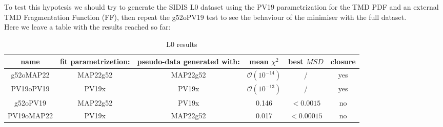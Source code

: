 \documentclass[12pt]{report}
\begin{document}
To test this hypotesis we should try to generate the SIDIS L0 dataset using the PV19 parametrization for the TMD PDF and an external TMD Fragmentation Function (FF), then repeat the g52oPV19 test to see the behaviour of the minimiser with the full dataset.\\

Here we leave a table with the results reached so far:

\begin{table}[h]
    \caption{L0 results}
    \label{tab:L0_results}
    \centering
    \begin{adjustbox}{width=\textwidth}
        \begin{tabular}{|c|c|c|c|c|c|}
        \hline
        \textbf{name} & \textbf{fit parametrizetion:} & \textbf{pseudo-data  generated with:} & \textbf{mean $\chi^2$} & \textbf{best $MSD$} & \textbf{closure}\\
        \hline
        g52oMAP22 & MAP22g52 & MAP22g52 & $\mathcal{O}(10^{-14})$ & / & yes \\
        PV19oPV19 & PV19x & PV19x & $\mathcal{O}(10^{-13})$ & / & yes \\
        g52oPV19 & MAP22g52 &  PV19x & 0.146 & $< 0.0015$ & no \\
        PV19oMAP22 & PV19x & MAP22g52 & 0.017 & $< 0.00015$& no \\
        \hline
    \end{tabular}
\end{adjustbox}
\end{table}
\end{document}
